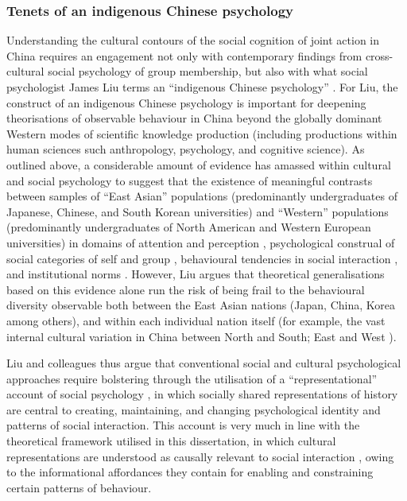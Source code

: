 \begin{CJK}{UTF8}{gbsn}
\subsubsection{Tenets of an indigenous Chinese psychology\label{sect:indigPsych}}
Understanding the cultural contours of the social cognition of joint action in China requires an engagement not only with contemporary findings from cross-cultural social psychology of group membership, but also with what social psychologist James Liu terms an ``indigenous Chinese psychology'' \citep{Liu2009}.  For Liu, the construct of an indigenous Chinese psychology is important for deepening theorisations of observable behaviour in China beyond the globally dominant Western modes of scientific knowledge production (including productions within human sciences such anthropology, psychology, and cognitive science).  As outlined above, a considerable amount of evidence has amassed within cultural and social psychology to suggest that the existence of meaningful contrasts between samples of ``East Asian'' populations (predominantly undergraduates of Japanese, Chinese, and South Korean universities) and ``Western'' populations (predominantly undergraduates of North American and Western European universities) in domains of attention and perception \citep{Peng1997,Nisbett2003}, psychological construal of social categories of self and group \citep{Markus1991}, behavioural tendencies in social interaction \citep{Yuki2003}, and institutional norms \citep{Liu2017}.  However, Liu argues that theoretical generalisations based on this evidence alone run the risk of being frail to the behavioural diversity observable both between the East Asian nations (Japan, China, Korea among others), and within each individual nation itself (for example, the vast internal cultural variation in China between North and South; East and West \citep[see, for example,][]{Henrich2014}).

Liu and colleagues thus argue that conventional social and cultural psychological approaches require bolstering through the utilisation of a ``representational'' account of social psychology \citep{Liu2005}, in which socially shared representations of history are central to creating, maintaining, and changing psychological identity and patterns of social interaction.  This account is very much in line with the theoretical framework utilised in this dissertation, in which cultural representations are understood as causally relevant to social interaction \citep{Vesper2017}, owing to the informational affordances they contain for enabling and constraining certain patterns of behaviour.


\end{CJK}
